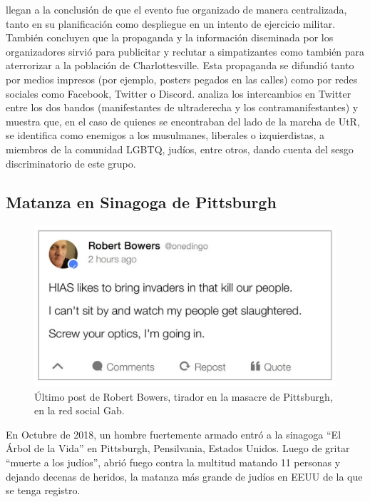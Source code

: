 \citet{blout2020white} llegan a la conclusión de que el evento fue organizado de manera centralizada, tanto en su planificación como despliegue en un intento de ejercicio militar. También concluyen que la propaganda y la información diseminada por los organizadores sirvió para publicitar y reclutar a simpatizantes como también para aterrorizar a la población de Charlottesville. Esta propaganda se difundió tanto por medios impresos (por ejemplo, posters pegados en las calles) como por redes sociales como Facebook, Twitter o Discord. \citet{klein2019twitter} analiza los intercambios en Twitter entre los dos bandos (manifestantes de ultraderecha y los contramanifestantes) y muestra que, en el caso de quienes se encontraban del lado de la marcha de UtR, se identifica como enemigos a los musulmanes, liberales o izquierdistas, a miembros de la comunidad LGBTQ, judíos, entre otros, dando cuenta del sesgo discriminatorio de este grupo.


\subsection{Matanza en Sinagoga de Pittsburgh}


\begin{figure}[t]
    \centering
    \includegraphics[height=6cm, keepaspectratio]{img/gab-pittsburgh-post.jpg}
    \caption{Último post de Robert Bowers, tirador en la masacre de Pittsburgh, en la red social Gab.}
    \label{fig:gab_post}
\end{figure}


En Octubre de 2018, un hombre fuertemente armado entró a la sinagoga ``El Árbol de la Vida'' en Pittsburgh, Pensilvania, Estados Unidos. Luego de gritar ``muerte a los judíos'', abrió fuego contra la multitud matando 11 personas y dejando decenas de heridos, la matanza más grande de judíos en EEUU de la que se tenga registro.


